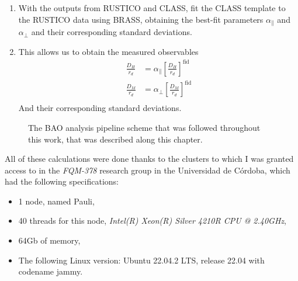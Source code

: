 \begin{enumerate}
\item With the outputs from RUSTICO and CLASS, fit the CLASS template to the RUSTICO data using BRASS, obtaining the best-fit parameters $\alpha_\parallel$ and $\alpha_\perp$ and their corresponding standard deviations.
\item This allows us to obtain the measured observables 
\begin{align}
	\frac{D_H}{r_d} &= \alpha_\parallel \left[ \frac{D_H}{r_d} \right]^\text{fid} \\
	\frac{D_M}{r_d} &= \alpha_\perp \left[ \frac{D_M}{r_d} \right]^\text{fid} \\
\end{align}
And their corresponding standard deviations.

\end{enumerate}



\begin{figure}[b]
    \centering
    \caption[The BAO analysis pipeline schematic]{The BAO analysis pipeline scheme that was  followed throughout this work, that was described along this chapter. }
    \label{fig:pipeline}
\end{figure}
 \newpage
All of these calculations were done thanks to the clusters to which I was granted access to in the \textit{FQM-378} research group in the Universidad de Córdoba, which had the following specifications: 
\begin{itemize}
	\item 1 node, named Pauli,
\item 40 threads for this node, \textit{Intel(R) Xeon(R) Silver 4210R CPU @ 2.40GHz},
\item 64Gb of memory,
\item The following Linux version: Ubuntu 22.04.2 LTS, release 22.04 with codename jammy.
\end{itemize}
